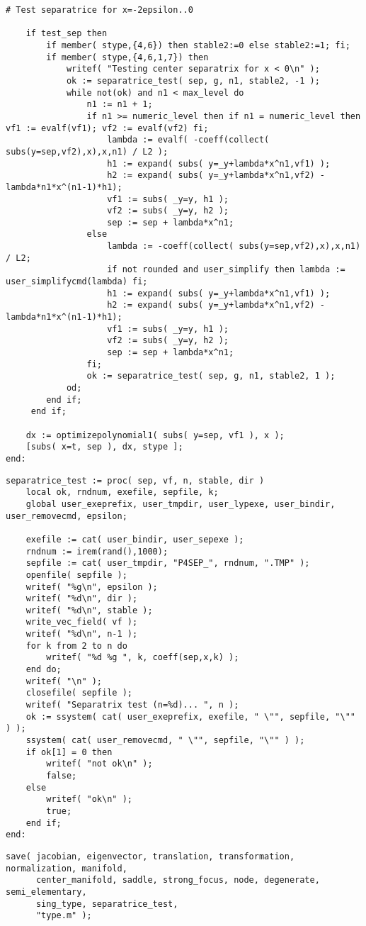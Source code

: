 \documentclass[a4paper,10pt]{article}
\begin{document}
\begin{lstlisting}[name=type]
    # Test separatrice for x=-2epsilon..0

    if test_sep then
        if member( stype,{4,6}) then stable2:=0 else stable2:=1; fi;
        if member( stype,{4,6,1,7}) then
            writef( "Testing center separatrix for x < 0\n" );
            ok := separatrice_test( sep, g, n1, stable2, -1 );
            while not(ok) and n1 < max_level do
                n1 := n1 + 1;
                if n1 >= numeric_level then if n1 = numeric_level then vf1 := evalf(vf1); vf2 := evalf(vf2) fi;
                    lambda := evalf( -coeff(collect( subs(y=sep,vf2),x),x,n1) / L2 );
                    h1 := expand( subs( y=_y+lambda*x^n1,vf1) );
                    h2 := expand( subs( y=_y+lambda*x^n1,vf2) - lambda*n1*x^(n1-1)*h1);
                    vf1 := subs( _y=y, h1 );
                    vf2 := subs( _y=y, h2 );
                    sep := sep + lambda*x^n1;
                else
                    lambda := -coeff(collect( subs(y=sep,vf2),x),x,n1) / L2;
                    if not rounded and user_simplify then lambda := user_simplifycmd(lambda) fi;
                    h1 := expand( subs( y=_y+lambda*x^n1,vf1) );
                    h2 := expand( subs( y=_y+lambda*x^n1,vf2) - lambda*n1*x^(n1-1)*h1);
                    vf1 := subs( _y=y, h1 );
                    vf2 := subs( _y=y, h2 );
                    sep := sep + lambda*x^n1;
                fi;
                ok := separatrice_test( sep, g, n1, stable2, 1 );
            od;
        end if;
     end if;

    dx := optimizepolynomial1( subs( y=sep, vf1 ), x );
    [subs( x=t, sep ), dx, stype ];
end:
\end{lstlisting}

\begin{lstlisting}[name=type]
separatrice_test := proc( sep, vf, n, stable, dir )
    local ok, rndnum, exefile, sepfile, k;
    global user_exeprefix, user_tmpdir, user_lypexe, user_bindir, user_removecmd, epsilon;

    exefile := cat( user_bindir, user_sepexe );
    rndnum := irem(rand(),1000);
    sepfile := cat( user_tmpdir, "P4SEP_", rndnum, ".TMP" );
    openfile( sepfile );
    writef( "%g\n", epsilon );
    writef( "%d\n", dir );
    writef( "%d\n", stable );
    write_vec_field( vf );
    writef( "%d\n", n-1 );
    for k from 2 to n do
        writef( "%d %g ", k, coeff(sep,x,k) );
    end do;
    writef( "\n" );
    closefile( sepfile );
    writef( "Separatrix test (n=%d)... ", n );
    ok := ssystem( cat( user_exeprefix, exefile, " \"", sepfile, "\"" ) );
    ssystem( cat( user_removecmd, " \"", sepfile, "\"" ) );
    if ok[1] = 0 then
        writef( "not ok\n" );
        false;
    else
        writef( "ok\n" );
        true;
    end if;
end:
\end{lstlisting}

\begin{lstlisting}[name=type]
save( jacobian, eigenvector, translation, transformation, normalization, manifold,
      center_manifold, saddle, strong_focus, node, degenerate, semi_elementary,
      sing_type, separatrice_test,
      "type.m" );
\end{lstlisting}
\end{document}
